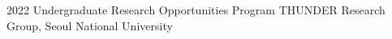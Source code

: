 

\begin{cvskills}


  \cvskill
    {2022} %
    {Undergraduate Research Opportunities Program} %
    {THUNDER Research Group, Seoul National University} %

\end{cvskills}

